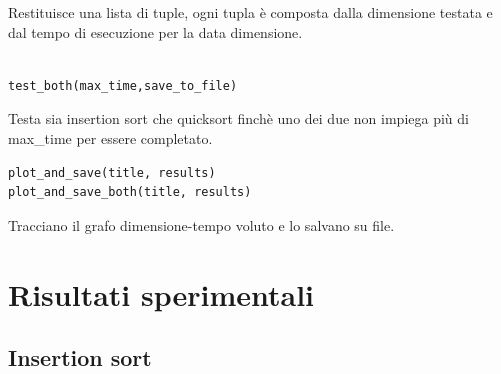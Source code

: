 \documentclass[]{article}
\begin{document}
Restituisce una lista di tuple, ogni tupla è composta dalla dimensione testata e dal tempo di esecuzione per la data dimensione.\\\\
\begin{verbatim}
test_both(max_time,save_to_file)
\end{verbatim}
Testa sia insertion sort che quicksort finchè uno dei due non impiega più di max\_time per essere completato.
\begin{verbatim}
plot_and_save(title, results)
plot_and_save_both(title, results)
\end{verbatim}
Tracciano il grafo dimensione-tempo voluto e lo salvano su file.
\section{Risultati sperimentali}
\subsection{Insertion sort}
\end{document}

